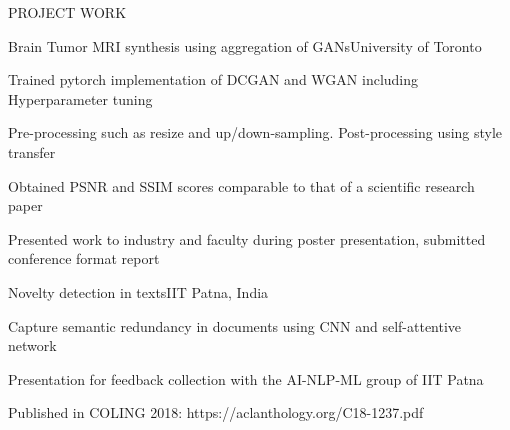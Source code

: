 \documentclass{resume}
\begin{document}
  \begin{rSection}{PROJECT WORK}

    \begin{rSubsection}{Brain Tumor MRI synthesis using aggregation of GANs}{University of Toronto}{}{}
      \item Trained pytorch implementation of DCGAN and WGAN including Hyperparameter tuning
      \item Pre-processing such as resize and up/down-sampling. Post-processing using style transfer
      \item Obtained PSNR and SSIM scores comparable to that of a scientific research paper
      \item Presented work to industry and faculty during poster presentation, submitted conference format report
    \end{rSubsection}

    \begin{rSubsection}{Novelty detection in texts}{IIT Patna, India}{}{}
      \item Capture semantic redundancy in documents using CNN and self-attentive network
      \item Presentation for feedback collection with the AI-NLP-ML group of IIT Patna
      \item Published in COLING 2018: https://aclanthology.org/C18-1237.pdf
    \end{rSubsection}




\end{rSection}
\end{document}
